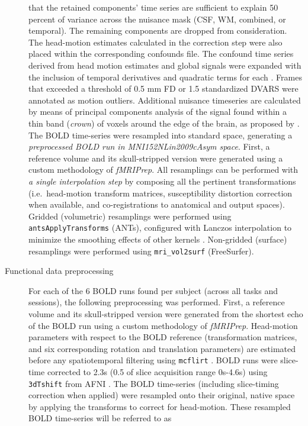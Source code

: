\documentclass[
]{article}
\begin{document}
\begin{description}
that the retained components' time series are sufficient to explain 50
percent of variance across the nuisance mask (CSF, WM, combined, or
temporal). The remaining components are dropped from consideration. The
head-motion estimates calculated in the correction step were also placed
within the corresponding confounds file. The confound time series
derived from head motion estimates and global signals were expanded with
the inclusion of temporal derivatives and quadratic terms for each
\citep{confounds_satterthwaite_2013}. Frames that exceeded a threshold
of 0.5 mm FD or 1.5 standardized DVARS were annotated as motion
outliers. Additional nuisance timeseries are calculated by means of
principal components analysis of the signal found within a thin band
(\emph{crown}) of voxels around the edge of the brain, as proposed by
\citep{patriat_improved_2017}. The BOLD time-series were resampled into
standard space, generating a \emph{preprocessed BOLD run in
MNI152NLin2009cAsym space}. First, a reference volume and its
skull-stripped version were generated using a custom methodology of
\emph{fMRIPrep}. All resamplings can be performed with \emph{a single
interpolation step} by composing all the pertinent transformations
(i.e.~head-motion transform matrices, susceptibility distortion
correction when available, and co-registrations to anatomical and output
spaces). Gridded (volumetric) resamplings were performed using
\texttt{antsApplyTransforms} (ANTs), configured with Lanczos
interpolation to minimize the smoothing effects of other kernels
\citep{lanczos}. Non-gridded (surface) resamplings were performed using
\texttt{mri\_vol2surf} (FreeSurfer).
\item[Functional data preprocessing]
For each of the 6 BOLD runs found per subject (across all tasks and
sessions), the following preprocessing was performed. First, a reference
volume and its skull-stripped version were generated from the shortest
echo of the BOLD run using a custom methodology of \emph{fMRIPrep}.
Head-motion parameters with respect to the BOLD reference
(transformation matrices, and six corresponding rotation and translation
parameters) are estimated before any spatiotemporal filtering using
\texttt{mcflirt} \citep[FSL 6.0.5.1:57b01774,][]{mcflirt}. BOLD runs
were slice-time corrected to 2.3s (0.5 of slice acquisition range
0s-4.6s) using \texttt{3dTshift} from AFNI
\citep[RRID:SCR\_005927]{afni}. The BOLD time-series (including
slice-timing correction when applied) were resampled onto their
original, native space by applying the transforms to correct for
head-motion. These resampled BOLD time-series will be referred to as

\end{description}
\end{document}
